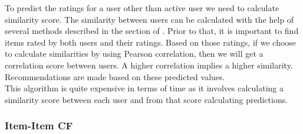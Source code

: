 \noindent To predict the ratings for a user other than active user we need to calculate similarity score. The similarity between users can be calculated with the help of several methods described in the section of . Prior to that, it is important to find items rated by both users and their ratings. Based on those ratings, if we choose to calculate similarities by using Pearson correlation, then we will get a correlation score between users. A higher correlation implies a higher similarity. Recommendations are made based on these predicted values. 
\\
This algorithm is quite expensive in terms of time as it involves calculating a similarity score between each user and from that score calculating predictions. 
\\

\subsubsection{Item-Item CF}

